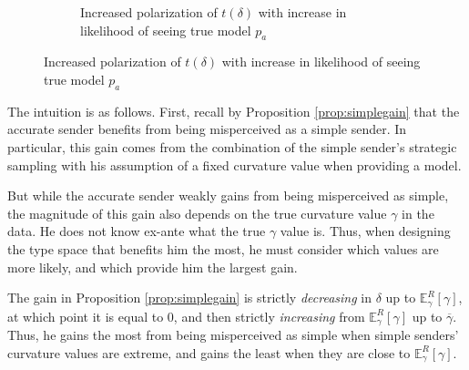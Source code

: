 \documentclass[11pt,dvipsnames]{article}
\begin{document}
\begin{figure}[H]
\begin{subfigure}[t]{0.49\textwidth}
    \caption{Increased polarization of $t(\delta)$ with increase in likelihood of seeing true model $p_a$}
    \end{subfigure}
    \label{fig:typespace}
\end{figure}
The intuition is as follows.
First, recall by Proposition \ref{prop:simplegain} that the accurate sender benefits from being misperceived as a simple sender.
In particular, this gain comes from the combination of the simple sender's strategic sampling with his assumption of a fixed curvature value when providing a model.

But while the accurate sender weakly gains from being misperceived as simple, the magnitude of this gain also depends on the true curvature value $\gamma$ in the data.
He does not know ex-ante what the true $\gamma$ value is.
Thus, when designing the type space that benefits him the most, he must consider which values are more likely, and which provide him the largest gain.

The gain in Proposition \ref{prop:simplegain} is strictly \emph{decreasing} in $\delta$ up to $\mathbb{E}_\gamma^R[\gamma]$, at which point it is equal to $0$, and then strictly \emph{increasing} from $\mathbb{E}_\gamma^R[\gamma]$ up to $\overline{\gamma}$.
Thus, he gains the most from being misperceived as simple when simple senders' curvature values are extreme, and gains the least when they are close to $\mathbb{E}_\gamma^R[\gamma]$.
\end{document}
